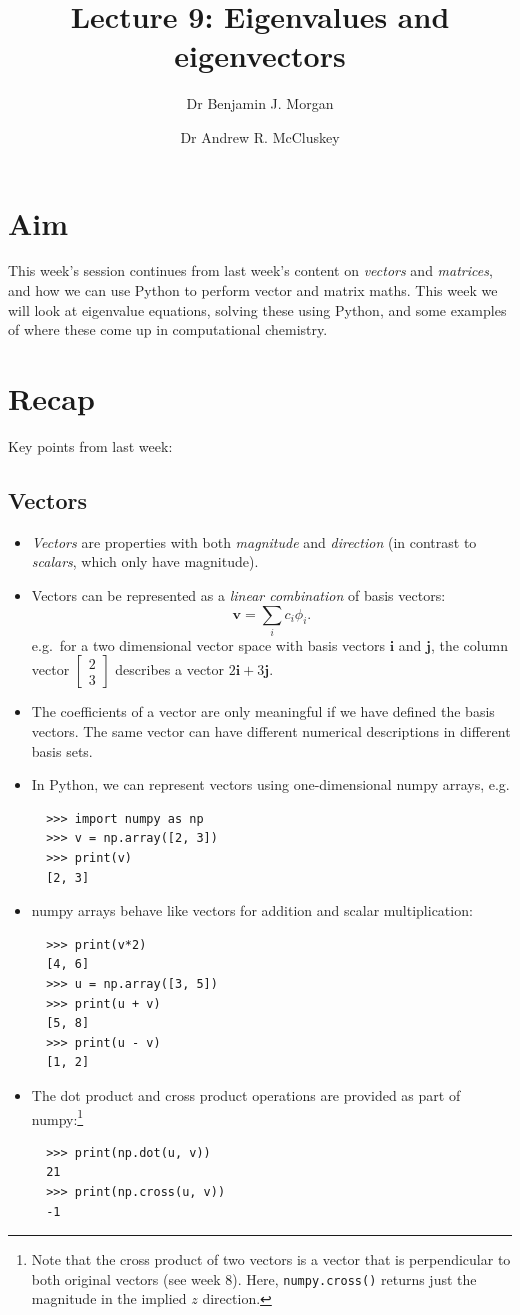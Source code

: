 \documentclass[a4paper]{article}
\title{Lecture 9: Eigenvalues and eigenvectors}
\author[1]{Dr Benjamin J. Morgan}
\author[1,2]{Dr Andrew R. McCluskey}
\affil[1]{Department of Chemistry, University of Bath, email: b.j.morgan@bath.ac.uk}
\affil[2]{Diamond Light Source, email: andrew.mccluskey@diamond.ac.uk}
\newcommand{\bvec}[1]{\boldsymbol{\mathbf{#1}}}
\newcommand{\cvec}[2]{\begin{bmatrix}#1\\#2\end{bmatrix}}
\begin{document}
\maketitle

\section*{Aim}
This week's session continues from last week's content on \emph{vectors} and \emph{matrices}, and how we can use Python to perform vector and matrix maths.
This week we will look at eigenvalue equations, solving these using Python, and some examples of where these come up in computational chemistry.

\section{Recap}
Key points from last week:

\subsection{Vectors}
\begin{itemize}
  \item \emph{Vectors} are properties with both \emph{magnitude} and \emph{direction} (in contrast to \emph{scalars}, which only have magnitude).
  \item Vectors can be represented as a \emph{linear combination} of basis vectors:
    \begin{equation*}
    \bvec{v}=\sum_i c_i \phi_i.
    \end{equation*}
  e.g.\ for a two dimensional vector space with basis vectors $\bvec{i}$ and $\bvec{j}$, the column vector $\cvec{2}{3}$ describes a vector $2\bvec{i}+3\bvec{j}$.
  \item The coefficients of a vector are only meaningful if we have defined the basis vectors. The same vector can have different numerical descriptions in different basis sets.
  \item In Python, we can represent vectors using one-dimensional numpy arrays, e.g.
  \begin{lstlisting}
  >>> import numpy as np
  >>> v = np.array([2, 3])
  >>> print(v)
  [2, 3]
  \end{lstlisting}
  \item numpy arrays behave like vectors for addition and scalar multiplication:
  \begin{lstlisting}
  >>> print(v*2)
  [4, 6]
  >>> u = np.array([3, 5])
  >>> print(u + v)
  [5, 8]
  >>> print(u - v)
  [1, 2]
  \end{lstlisting}
  \item The dot product and cross product operations are provided as part of numpy:\footnote{Note that the cross product of two vectors is a vector that is perpendicular to both original vectors (see week 8). Here, \texttt{numpy.cross()} returns just the magnitude in the implied $z$ direction.} 
  \begin{lstlisting}
  >>> print(np.dot(u, v))
  21
  >>> print(np.cross(u, v))
  -1
  \end{lstlisting}

\end{itemize}
\end{document}
